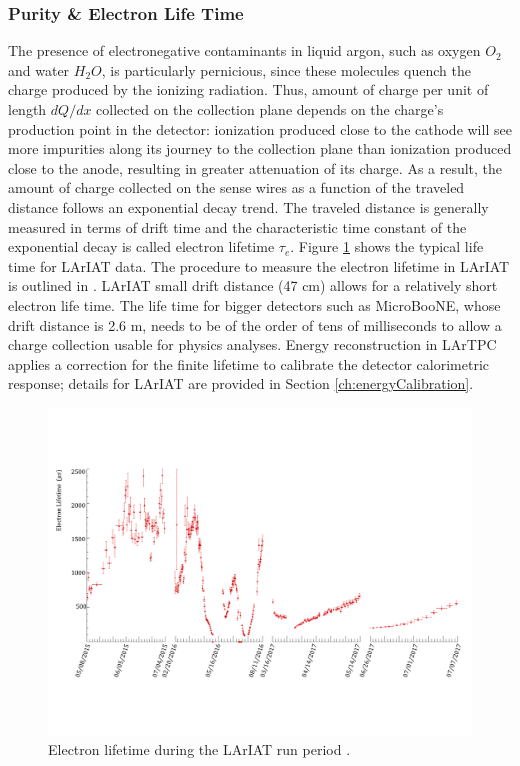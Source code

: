 \subsubsection{Purity \& Electron Life Time }
The presence of electronegative contaminants in liquid argon, such as oxygen $O_2$ and water $H_2O$, is particularly
pernicious, since these molecules quench the charge produced by the ionizing radiation.  Thus, amount of charge per unit of length $dQ/dx$ collected on the collection plane depends on the charge's production point in the detector: ionization produced  close to the cathode will see more impurities along its journey to the collection plane than ionization produced close to the anode, resulting in greater attenuation of its charge. As a result,  the amount of charge collected on the sense wires as a function of the traveled distance follows an exponential decay trend. The traveled distance is generally measured in terms of drift time and the  characteristic time constant of the exponential decay is called electron lifetime $\tau_e$. Figure \ref{fig:Elifetime} shows the typical life time for LArIAT data. The procedure to measure the electron lifetime in LArIAT is outlined in \cite{LArIATLifeTime}. LArIAT small drift distance (47 cm) allows for a relatively short electron life time. The life time for bigger detectors such as MicroBooNE, whose drift distance is 2.6 m, needs to be of the order of tens of milliseconds to allow a charge collection usable for physics analyses. Energy reconstruction in LArTPC applies a correction for the finite lifetime to calibrate the detector calorimetric response; details for LArIAT are provided in Section \ref{ch:energyCalibration}.

\begin{figure}[hbpt]
\centering
\includegraphics[width=\textwidth]{Chapter-2/Images/ELifetime.png}
\caption{Electron lifetime during the LArIAT run period \cite{detectorPaper}.}
\label{fig:Elifetime}
\end{figure}


